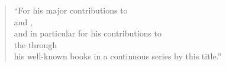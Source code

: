 
\begin{frame}{}
  \begin{center}
  \end{center}
\end{frame}

\begin{frame}{}

  \begin{center}
  \end{center}
\end{frame}

\begin{frame}{}

  \begin{center}
  \end{center}

  \pause
  \begin{quote}
    \begin{center}
      {\large
      ``For his major contributions to  \\[5pt]
      and , \\[5pt]
      and in particular for his contributions to \\[5pt]
      the  through \\[5pt]
      his well-known books in a continuous series by this title.''}
    \end{center}
  \end{quote}
\end{frame}

